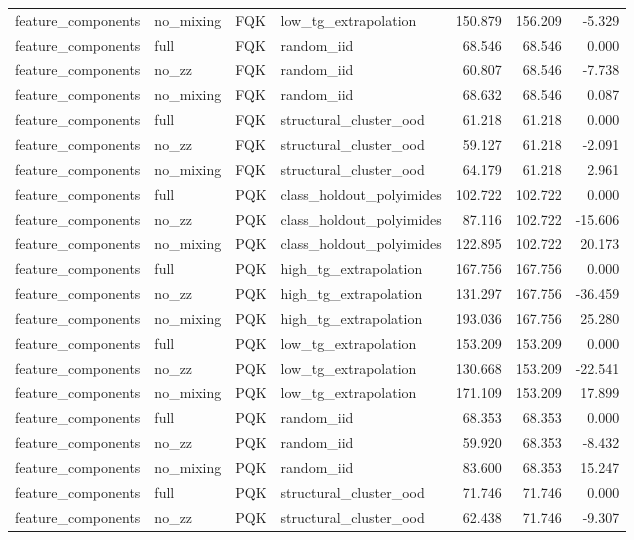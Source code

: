 \begin{tabular}{llllrrr}
feature\_components & no\_mixing & FQK & low\_tg\_extrapolation & 150.879 & 156.209 & -5.329 \\
feature\_components & full & FQK & random\_iid & 68.546 & 68.546 & 0.000 \\
feature\_components & no\_zz & FQK & random\_iid & 60.807 & 68.546 & -7.738 \\
feature\_components & no\_mixing & FQK & random\_iid & 68.632 & 68.546 & 0.087 \\
feature\_components & full & FQK & structural\_cluster\_ood & 61.218 & 61.218 & 0.000 \\
feature\_components & no\_zz & FQK & structural\_cluster\_ood & 59.127 & 61.218 & -2.091 \\
feature\_components & no\_mixing & FQK & structural\_cluster\_ood & 64.179 & 61.218 & 2.961 \\
feature\_components & full & PQK & class\_holdout\_polyimides & 102.722 & 102.722 & 0.000 \\
feature\_components & no\_zz & PQK & class\_holdout\_polyimides & 87.116 & 102.722 & -15.606 \\
feature\_components & no\_mixing & PQK & class\_holdout\_polyimides & 122.895 & 102.722 & 20.173 \\
feature\_components & full & PQK & high\_tg\_extrapolation & 167.756 & 167.756 & 0.000 \\
feature\_components & no\_zz & PQK & high\_tg\_extrapolation & 131.297 & 167.756 & -36.459 \\
feature\_components & no\_mixing & PQK & high\_tg\_extrapolation & 193.036 & 167.756 & 25.280 \\
feature\_components & full & PQK & low\_tg\_extrapolation & 153.209 & 153.209 & 0.000 \\
feature\_components & no\_zz & PQK & low\_tg\_extrapolation & 130.668 & 153.209 & -22.541 \\
feature\_components & no\_mixing & PQK & low\_tg\_extrapolation & 171.109 & 153.209 & 17.899 \\
feature\_components & full & PQK & random\_iid & 68.353 & 68.353 & 0.000 \\
feature\_components & no\_zz & PQK & random\_iid & 59.920 & 68.353 & -8.432 \\
feature\_components & no\_mixing & PQK & random\_iid & 83.600 & 68.353 & 15.247 \\
feature\_components & full & PQK & structural\_cluster\_ood & 71.746 & 71.746 & 0.000 \\
feature\_components & no\_zz & PQK & structural\_cluster\_ood & 62.438 & 71.746 & -9.307 \\

\end{tabular}
